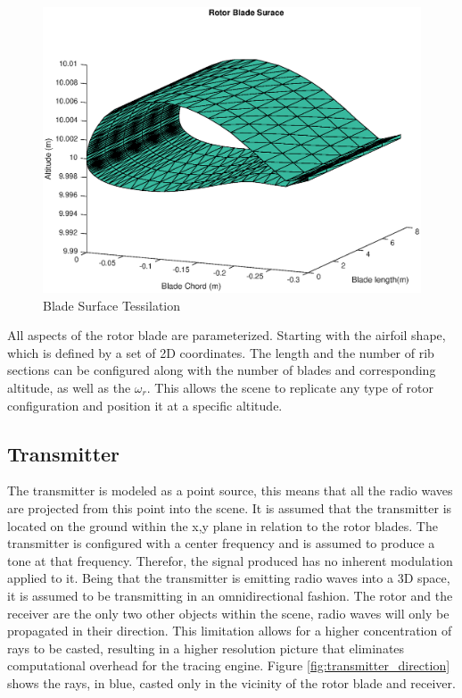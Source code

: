 \begin{figure}
	\begin{center}
		\includegraphics[width=15cm]{images/radio_propagation/blade_surface_tesselation.eps}
		\caption{Blade Surface Tessilation}
		\label{fig:tessilation}
	\end{center}
\end{figure}

All aspects of the rotor blade are parameterized. Starting with the airfoil shape, which is defined by a set of 2D coordinates. The length and the number of rib sections can be configured along with the number of blades and corresponding altitude, as well as the $\omega_r$. This allows the scene to replicate any type of rotor configuration and position it at a specific altitude.

\subsection{Transmitter}
The transmitter is modeled as a point source, this means that all the radio waves are projected from this point into the scene. It is assumed that the transmitter is located on the ground within the x,y plane in relation to the rotor blades. The transmitter is configured with a center frequency and is assumed to produce a tone at that frequency. Therefor, the signal produced has no inherent modulation applied to it.
Being that the transmitter is emitting radio waves into a 3D space, it is assumed to be transmitting in an omnidirectional fashion. The rotor and the receiver are the only two other objects within the scene, radio waves will only be propagated in their direction. This limitation allows for a higher concentration of rays to be casted, resulting in a higher resolution picture that eliminates computational overhead for the tracing engine. Figure \ref{fig:transmitter_direction} shows the rays, in blue, casted only in the vicinity of the rotor blade and receiver.

